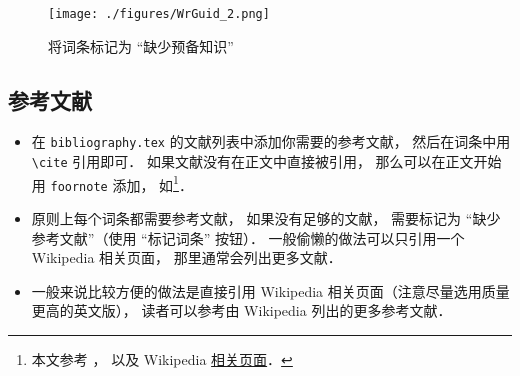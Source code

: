 \begin{figure}[ht]
\centering
\texttt{[image: ./figures/WrGuid\_2.png]}
\caption{将词条标记为 “缺少预备知识”} \label{WrGuid_fig2}
\end{figure}

\subsection{参考文献}
\begin{itemize}
\item 在 \verb|bibliography.tex| 的文献列表中添加你需要的参考文献， 然后在词条中用 \verb|\cite| 引用即可． 如果文献没有在正文中直接被引用， 那么可以在正文开始用 \verb|foornote| 添加， 如\footnote{本文参考 \cite{GriffE}， \cite{GriffQ} 以及 Wikipedia \href{https://www.wikipedia.org/}{相关页面}．}．
\item 原则上每个词条都需要参考文献， 如果没有足够的文献， 需要标记为 “缺少参考文献”（使用 “标记词条” 按钮）． 一般偷懒的做法可以只引用一个 Wikipedia 相关页面， 那里通常会列出更多文献．
\item 一般来说比较方便的做法是直接引用 Wikipedia 相关页面（注意尽量选用质量更高的英文版）， 读者可以参考由 Wikipedia 列出的更多参考文献．
\end{itemize}

